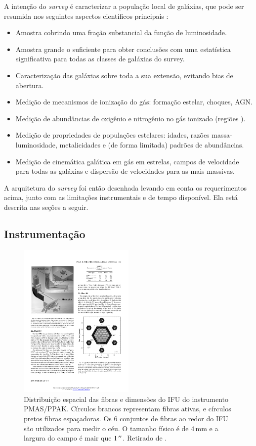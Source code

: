 A intenção do {\em survey} é caracterizar a população local de galáxias, que
pode ser resumida nos seguintes aspectos científicos principais
\citep{Sanchez2012}:
\begin{itemize}
  \item Amostra cobrindo uma fração substancial da função de luminosidade.
  \item Amostra grande o suficiente para obter conclusões com uma estatística
  significativa para todas as classes de galáxias do survey.
  \item Caracterização das galáxias sobre toda a sua extensão, evitando bias de
  abertura.
  \item Medição de mecanismos de ionização do gás: formação estelar, choques,
  AGN.
  \item Medição de abundâncias de oxigênio e nitrogênio no gás ionizado (regiões
  \HII).
  \item Medição de propriedades de populações estelares: idades, razões
  massa-luminosidade, metalicidades e (de forma limitada) padrões de
  abundâncias.
  \item Medição de cinemática galática em gás em estrelas, campos de velocidade
  para todas as galáxias e dispersão de velocidades para as mais massivas.
\end{itemize}
A arquitetura do {\em survey} foi então desenhada levando em conta os
requerimentos acima, junto com as limitações instrumentais e de tempo
disponível. Ela está descrita nas seções a seguir.

\subsection{Instrumentação}
\label{sec:ifs:instrumentacao}

\begin{figure}
	\includegraphics[width=0.5\textwidth]{figuras/PPAK}
	\caption[Distribuição das fibras no instrumento PMAS/PPAK]
	{Distribuição espacial das fibras e dimensões do IFU do instrumento PMAS/PPAK.
	Círculos brancos representam fibras ativas, e círculos pretos fibras
	espaçadoras. Os 6 conjuntos de fibras ao redor do IFU são utilizados
	para medir o céu. O tamanho físico é de $4\,\mathrm{mm}$ e a largura
	do campo é mair que $1\,^{\prime\prime}$. Retirado de	\citet{Kelz2006}.}
	\label{fig:PPAK}
\end{figure}

